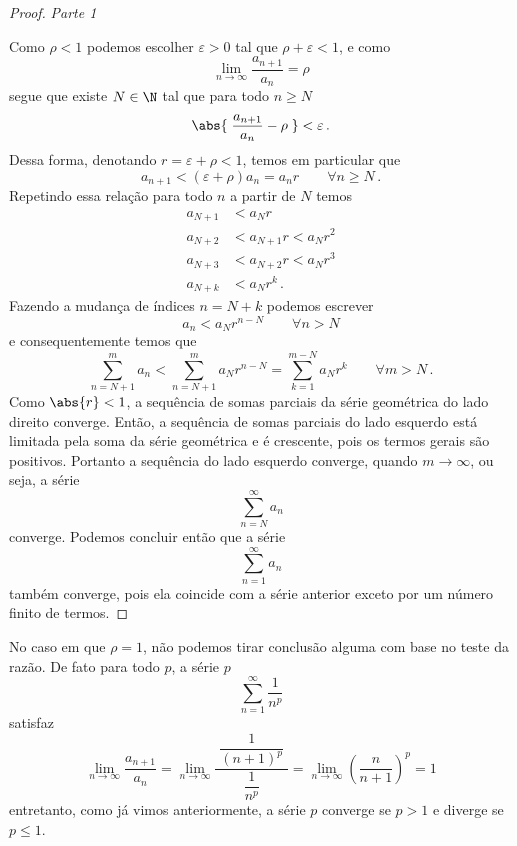 \begin{proof}
  \emph{Parte 1}

  Como $\rho<1$ podemos escolher $\varepsilon>0$ tal que $\rho+\varepsilon<1$,
  e como
  \[
    \lim_{n\to\infty} \frac{a_{n+1}}{a_n} = \rho
  \]
  segue que existe $N\in \N$ tal que para todo $n\geq N$
  \[
    \abs{\;\frac{a_{n+1}}{a_n}-\rho\;} < \varepsilon    \,.
  \]
  Dessa forma, denotando $r=\varepsilon+\rho<1$, temos em particular que
  \[
    a_{n+1} < (\varepsilon+\rho)a_n
            = a_nr
    \qquad \forall n\geq N      \,.
  \]
  Repetindo essa relação para todo $n$ a partir de $N$ temos
  \begin{align*}
    a_{N+1} & < a_N r \\
    a_{N+2} & < a_{N+1} r < a_N r^2 \\
    a_{N+3} & < a_{N+2} r < a_N r^3 \\
    a_{N+k} & < a_N r^k             \,.
  \end{align*}
  Fazendo a mudança de índices $n=N+k$ podemos escrever
  \[
    a_n < a_N r^{n-N}
    \qquad \forall n> N
  \]
  e consequentemente temos que
  \[
    \sum_{n=N+1}^m a_n < \sum_{n=N+1}^{m} a_N r^{n-N}
                       = \sum_{k=1}^{m-N} a_N r^k
    \qquad \forall m > N                \,.
  \]
  Como $\abs{r}<1$, a sequência de somas parciais da série geométrica
  do lado direito converge.
  Então, a sequência de somas parciais do lado esquerdo está limitada
  pela soma da série geométrica e é crescente, pois os termos
  gerais são positivos.
  Portanto a sequência do lado esquerdo converge, quando $m\to\infty$,
  ou seja, a série
  \[
    \sum_{n=N}^\infty a_n
  \]
  converge.
  Podemos concluir então que a série
  \[
    \sum_{n=1}^\infty a_n
  \]
  também converge, pois ela coincide com a série anterior exceto por um
  número finito de termos.

%
\end{proof}

No caso em que $\rho=1$, não podemos tirar conclusão alguma com base
no teste da razão. De fato para todo $p$, a série $p$
\[
  \sum_{n=1}^\infty \frac{1}{n^p}
\]
satisfaz
\[
    \lim_{n\to \infty} \dfrac{a_{n+1}}{a_n}
        = \lim_{n\to \infty} \dfrac{\;\dfrac{1}{(n+1)^p}\;}{\dfrac{1}{n^p}}
        = \lim_{n\to \infty} \left(\dfrac{n}{n+1}\right)^p
        = 1
\]
entretanto, como já vimos anteriormente, a série $p$ converge se $p>1$ e diverge se $p\leq 1$.

